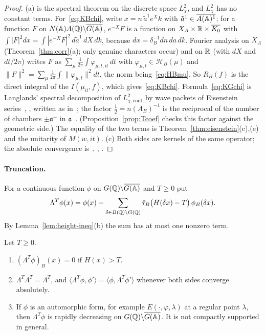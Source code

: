\begin{proof}
(a) is the spectral theorem on the discrete space $L^2_\chi$, and
$L^2_\chi$ has no constant terms. For~\eqref{eq:KBchi}, write $x=n\,
\tilde a^1e^Xk$ with $\tilde a^1\in\overline{A(\mathbb{A})^1}$; for a function
$F$ on $N(\mathbb{A})A(\mathbb{Q})\backslash\overline{G(\mathbb{A})}$, $e^{-X}F$ is a function on
$X_A\times\mathbb{R}\times\overline{K_0}$ with $\int|F|^2dx=\int|e^{-X}F|^2\,
d\tilde a^1\,dX\,dk$, because $dx=\delta_B^{-1}dn\,da\,dk$. Fourier
analysis on $X_A$ (Theorem~\ref{thm:corr}(a); only genuine characters
occur) and on $\mathbb{R}$ (with $dX$ and $dt/2\pi$) writes $F$ as
$\sum_\mu\frac1{2\pi}\int\varphi_{\mu,t,it}\,dt$ with $\varphi_{\mu,t}\in
\mathcal H_B(\mu)$ and $\|F\|^2=\sum_\mu\frac1{2\pi}\int
\|\varphi_{\mu,t}\|^2dt$, the norm being~\eqref{eq:HBmu}. So
$R_B(f)$ is the direct integral of the $I(\mu_{it},f)$, which
gives~\eqref{eq:KBchi}. Formula~\eqref{eq:KGchi} is Langlands' spectral
decomposition of $L^2_{\chi,\mathrm{cont}}$ by wave packets of
Eisenstein series~\cite[Ch.~7]{La76}, \cite[Ch.~V]{MW95}, written as
in~\cite[\S4]{Ar80}; the factor $\frac12=n(A_B)^{-1}$ is the reciprocal of
the number of chambers $\pm\mathfrak a^+$ in $\mathfrak a$~\cite[p.~927]{Ar78}.
(Proposition~\ref{prop:Tcoef} checks this factor against the geometric
side.) The equality of the two terms is Theorem~\ref{thm:eisenstein}(c),(e)
and the unitarity of $M(w,it)$. (c) Both sides are kernels of the same
operator; the absolute convergence is~\cite[\S3]{Ar80}, \cite{MW95},
\cite{Li13}.
\end{proof}

\paragraph{Truncation.} For a continuous function $\phi$ on
$G(\mathbb{Q})\backslash\overline{G(\mathbb{A})}$ and $T\ge0$ put
\begin{equation}\label{eq:trunc}
\Lambda^T\phi(x)=\phi(x)-\sum_{\delta\in B(\mathbb{Q})\backslash G(\mathbb{Q})}
\hat\tau_B\bigl(H(\delta x)-T\bigr)\,\phi_B(\delta x).
\end{equation}
By Lemma~\ref{lem:height-ineq}(b) the sum has at most one nonzero term.

\begin{lemma}\label{lem:truncation}
Let $T\ge0$.
\begin{enumerate}[label=(\alph*)]
\item $(\Lambda^T\phi)_B(x)=0$ if $H(x)>T$.
\item $\Lambda^T\Lambda^T=\Lambda^T$, and $\langle\Lambda^T\phi,\phi'\rangle
  =\langle\phi,\Lambda^T\phi'\rangle$ whenever both sides converge
  absolutely.
\item If $\phi$ is an automorphic form, for example $E(\cdot,\varphi,
  \lambda)$ at a regular point $\lambda$, then $\Lambda^T\phi$ is rapidly
  decreasing on $G(\mathbb{Q})\backslash\overline{G(\mathbb{A})}$. It is not compactly supported in
  general.
\end{enumerate}
\end{lemma}


